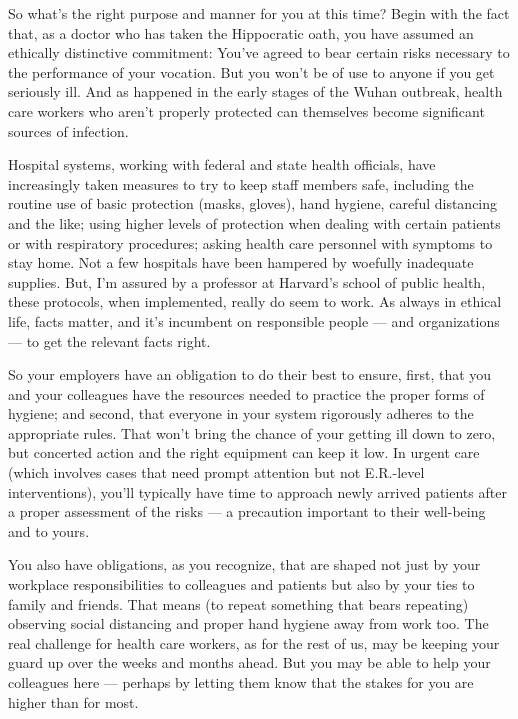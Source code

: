 So what's the right purpose and manner for you at this time? Begin with
the fact that, as a doctor who has taken the Hippocratic oath, you have
assumed an ethically distinctive commitment: You've agreed to bear
certain risks necessary to the performance of your vocation. But you
won't be of use to anyone if you get seriously ill. And as happened in
the early stages of the Wuhan outbreak, health care workers who aren't
properly protected can themselves become significant sources of
infection.

Hospital systems, working with federal and state health officials, have
increasingly taken measures to try to keep staff members safe, including
the routine use of basic protection (masks, gloves), hand hygiene,
careful distancing and the like; using higher levels of protection when
dealing with certain patients or with respiratory procedures; asking
health care personnel with symptoms to stay home. Not a few hospitals
have been hampered by woefully inadequate supplies. But, I'm assured by
a professor at Harvard's school of public health, these protocols, when
implemented, really do seem to work. As always in ethical life, facts
matter, and it's incumbent on responsible people --- and organizations
--- to get the relevant facts right.

So your employers have an obligation to do their best to ensure, first,
that you and your colleagues have the resources needed to practice the
proper forms of hygiene; and second, that everyone in your system
rigorously adheres to the appropriate rules. That won't bring the chance
of your getting ill down to zero, but concerted action and the right
equipment can keep it low. In urgent care (which involves cases that
need prompt attention but not E.R.-level interventions), you'll
typically have time to approach newly arrived patients after a proper
assessment of the risks --- a precaution important to their well-being
and to yours.

You also have obligations, as you recognize, that are shaped not just by
your workplace responsibilities to colleagues and patients but also by
your ties to family and friends. That means (to repeat something that
bears repeating) observing social distancing and proper hand hygiene
away from work too. The real challenge for health care workers, as for
the rest of us, may be keeping your guard up over the weeks and months
ahead. But you may be able to help your colleagues here --- perhaps by
letting them know that the stakes for you are higher than for most.

